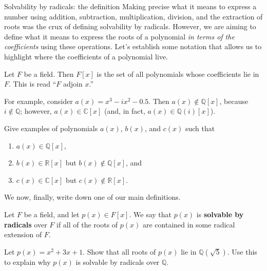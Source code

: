 \begin{section}{Solvability by radicals: the definition}
Making precise what it means to express a number using addition, subtraction, multiplication, division, and the extraction of roots was the crux of defining solvability by radicals. However, we are aiming to define what it means to express the roots of a polynomial \emph{in terms of the coefficients} using these operations. Let's establish some notation that allows us to highlight where the coefficients of a polynomial live.

\begin{definition}
Let $F$ be a field. Then $F[x]$ is the set of all polynomials whose coefficients lie in $F$. This is read ``$F$ adjoin $x$.''%
\end{definition}

For example, consider $a(x) = x^3 -ix^2 -0.5$. Then  $a(x) \notin \mathbb{Q}[x]$, because $i\notin \mathbb{Q}$; however, $a(x)\in\mathbb{C}[x]$ (and, in fact, $a(x)\in\mathbb{Q}\left(i\right)[x]$).
\begin{problem}
Give examples of polynomials $a(x)$, $b(x)$, and $c(x)$ such that 
\begin{enumerate}
\item $a(x) \in \mathbb{Q}[x]$, 
\item $b(x) \in \mathbb{R}[x]$ but $b(x) \notin \mathbb{Q}[x]$, and 
\item $c(x) \in \mathbb{C}[x]$ but $c(x) \notin \mathbb{R}[x]$.
\end{enumerate}
\end{problem}
We now, finally, write down one of our  main definitions.

\begin{definition}
Let $F$ be a field, and let $p(x)\in F[x]$. We say that $p(x)$ is \textbf{solvable by radicals} over $F$ if all of the roots of $p(x)$ are contained in some radical extension of $F$.
\end{definition}

\begin{problem}
Let $p(x) = x^2+3x+1$. Show that all roots of $p(x)$ lie in $\mathbb{Q}\left(\sqrt{5}\right)$. Use this to explain why $p(x)$ is solvable by radicals over $\mathbb{Q}$.
\end{problem}


\end{section}
